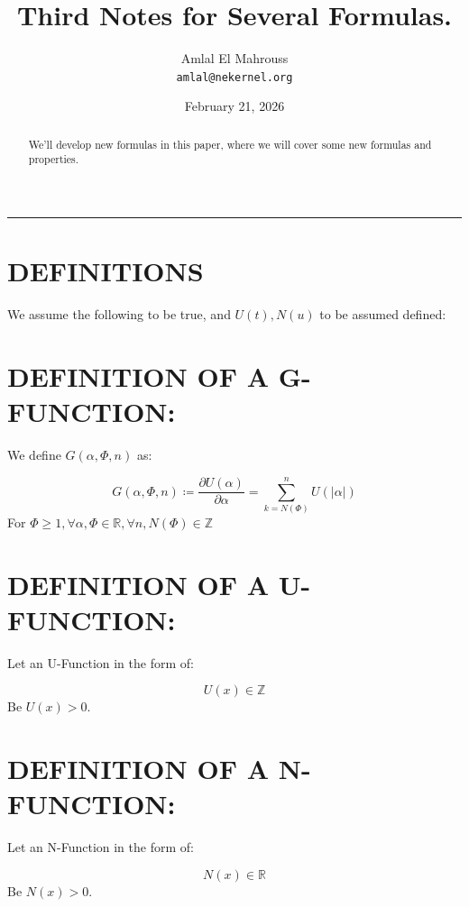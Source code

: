 \documentclass[11pt, a4paper]{article}
\title{Third Notes for Several Formulas.}
\author{Amlal El Mahrouss\\\texttt{amlal@nekernel.org}}
\date{February 21, 2026}
\begin{document}
\maketitle

\begin{center}
	\rule[0.01cm]{17cm}{0.01cm}
\end{center}

\begin{abstract}
\begin{center}
    We'll develop new formulas in this paper, where we will cover some new formulas and properties.
\end{center}
\end{abstract}

\section{DEFINITIONS}

We assume the following to be true, and $U(t), N(u)$ to be assumed defined:

\section{DEFINITION OF A G-FUNCTION:}

We define $G(\alpha, \Phi, n)$ as:

\begin{equation}
    G(\alpha, \Phi, n) \coloneqq \frac{\partial U(\alpha)}{\partial \alpha} = \sum_{k=N(\Phi)}^{n} U(|\alpha|)
\end{equation}
For $\Phi \geq 1, \forall \alpha, \Phi \in \mathbb{R}, \forall n, N(\Phi) \in \mathbb{Z}$

\section{DEFINITION OF A U-FUNCTION:}

Let an U-Function in the form of:

\begin{equation}
    U(x) \in \mathbb{Z}
\end{equation}
Be $U(x) > 0$.

\section{DEFINITION OF A N-FUNCTION:}

Let an N-Function in the form of:

\begin{equation}
    N(x) \in \mathbb{R}
\end{equation}
Be $N(x) > 0$.
\end{document}
